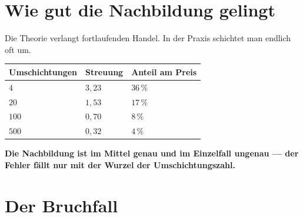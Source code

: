 \section{Wie gut die Nachbildung gelingt}

\begin{merksatz}
Die Theorie verlangt fortlaufenden Handel. In der Praxis schichtet man endlich oft um.

\begin{center}
{\small
\renewcommand{\arraystretch}{1.48}
\begin{tabular}{@{}P{3.0cm}P{2.0cm}P{2.4cm}@{}}
\toprule
\textbf{Umschich\-tungen} & \textbf{Streuung} & \textbf{Anteil am Preis}\\
\midrule
$4$ & $3{,}23$ & $36\,\%$\\
$20$ & $1{,}53$ & $17\,\%$\\
$100$ & $0{,}70$ & $8\,\%$\\
$500$ & $0{,}32$ & $4\,\%$\\
\bottomrule
\end{tabular}}
\end{center}

\begin{center}
\begin{minipage}{0.9\textwidth}
\textbf{Die Nachbildung ist im Mittel genau und im Einzelfall ungenau --- der Fehler fällt nur mit der Wurzel der Umschichtungszahl.}
\end{minipage}
\end{center}

\begin{center}
\begin{minipage}{0.88\textwidth}
\end{minipage}
\end{center}
\end{merksatz}

\section{Der Bruchfall}

